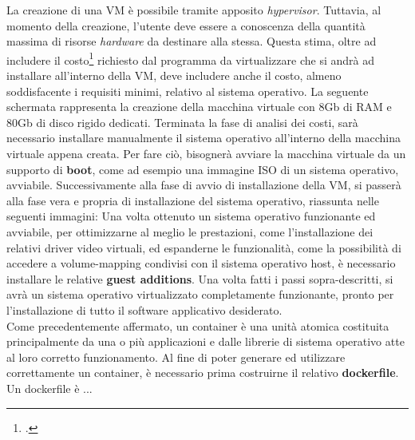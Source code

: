 La creazione di una VM è possibile tramite apposito \textit{hypervisor}. Tuttavia, al momento della creazione, l'utente deve essere a conoscenza della quantità massima di risorse \textit{hardware} da destinare alla stessa. Questa stima, oltre ad includere il costo\footcite{inteso come quantitativo di risorse fisiche da allocare} richiesto dal programma da virtualizzare che si andrà ad installare all'interno della VM, deve includere anche il costo, almeno soddisfacente i requisiti minimi, relativo al sistema operativo. 
La seguente schermata rappresenta la creazione della macchina virtuale con 8Gb di RAM e 80Gb di disco rigido dedicati.
Terminata la fase di analisi dei costi, sarà necessario installare manualmente il sistema operativo all'interno della macchina virtuale appena creata. Per fare ciò, bisognerà avviare la macchina virtuale da un supporto di \textbf{boot}, come ad esempio una immagine \gls{ISO} di un sistema operativo, avviabile.
Successivamente alla fase di avvio di installazione della VM, si passerà alla fase vera e propria di installazione del sistema operativo, riassunta nelle seguenti immagini:
Una volta ottenuto un sistema operativo funzionante ed avviabile, per ottimizzarne al meglio le prestazioni, come l'installazione dei relativi \gls{driver} video virtuali, ed espanderne le funzionalità, come la possibilità di accedere a volume-mapping condivisi con il sistema operativo host, è necessario installare le relative \textbf{\gls{guest additions}}.
Una volta fatti i passi sopra-descritti, si avrà un sistema operativo virtualizzato completamente funzionante, pronto per l'installazione di tutto il software applicativo desiderato.
\\
Come precedentemente affermato, un container è una unità atomica costituita principalmente da una o più applicazioni e dalle librerie di sistema operativo atte al loro corretto funzionamento.
Al fine di poter generare ed utilizzare correttamente un container, è necessario prima costruirne il relativo \textbf{\gls{dockerfile}}.
Un dockerfile è ...




